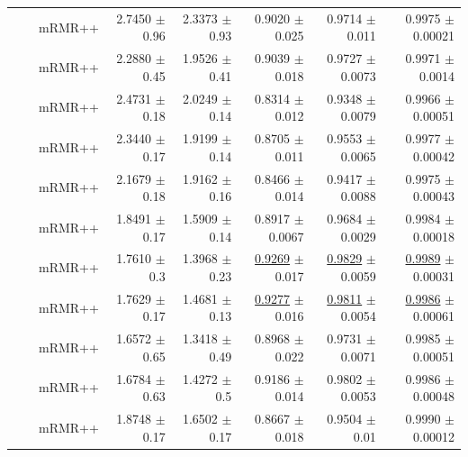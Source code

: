 \begin{longtable}{llp{}rrrrr}
 &  & mRMR++ & 2.7450 {\scriptsize $\pm$ 0.96} & 2.3373 {\scriptsize $\pm$ 0.93} & 0.9020 {\scriptsize $\pm$ 0.025} & 0.9714 {\scriptsize $\pm$ 0.011} & 0.9975 {\scriptsize $\pm$ 0.00021} \\
 &  & mRMR++ & 2.2880 {\scriptsize $\pm$ 0.45} & 1.9526 {\scriptsize $\pm$ 0.41} & 0.9039 {\scriptsize $\pm$ 0.018} & 0.9727 {\scriptsize $\pm$ 0.0073} & 0.9971 {\scriptsize $\pm$ 0.0014} \\
 &  & mRMR++ & 2.4731 {\scriptsize $\pm$ 0.18} & 2.0249 {\scriptsize $\pm$ 0.14} & 0.8314 {\scriptsize $\pm$ 0.012} & 0.9348 {\scriptsize $\pm$ 0.0079} & 0.9966 {\scriptsize $\pm$ 0.00051} \\
 &  & mRMR++ & 2.3440 {\scriptsize $\pm$ 0.17} & 1.9199 {\scriptsize $\pm$ 0.14} & 0.8705 {\scriptsize $\pm$ 0.011} & 0.9553 {\scriptsize $\pm$ 0.0065} & 0.9977 {\scriptsize $\pm$ 0.00042} \\
 &  & mRMR++ & 2.1679 {\scriptsize $\pm$ 0.18} & 1.9162 {\scriptsize $\pm$ 0.16} & 0.8466 {\scriptsize $\pm$ 0.014} & 0.9417 {\scriptsize $\pm$ 0.0088} & 0.9975 {\scriptsize $\pm$ 0.00043} \\
 &  & mRMR++ & 1.8491 {\scriptsize $\pm$ 0.17} & 1.5909 {\scriptsize $\pm$ 0.14} & 0.8917 {\scriptsize $\pm$ 0.0067} & 0.9684 {\scriptsize $\pm$ 0.0029} & 0.9984 {\scriptsize $\pm$ 0.00018} \\
 &  & mRMR++ & 1.7610 {\scriptsize $\pm$ 0.3} & 1.3968 {\scriptsize $\pm$ 0.23} & \underline{0.9269} {\scriptsize $\pm$ 0.017} & \underline{0.9829} {\scriptsize $\pm$ 0.0059} & \underline{0.9989} {\scriptsize $\pm$ 0.00031} \\
 &  & mRMR++ & 1.7629 {\scriptsize $\pm$ 0.17} & 1.4681 {\scriptsize $\pm$ 0.13} & \underline{0.9277} {\scriptsize $\pm$ 0.016} & \underline{0.9811} {\scriptsize $\pm$ 0.0054} & \underline{0.9986} {\scriptsize $\pm$ 0.00061} \\
 &  & mRMR++ & 1.6572 {\scriptsize $\pm$ 0.65} & 1.3418 {\scriptsize $\pm$ 0.49} & 0.8968 {\scriptsize $\pm$ 0.022} & 0.9731 {\scriptsize $\pm$ 0.0071} & 0.9985 {\scriptsize $\pm$ 0.00051} \\
 &  & mRMR++ & 1.6784 {\scriptsize $\pm$ 0.63} & 1.4272 {\scriptsize $\pm$ 0.5} & 0.9186 {\scriptsize $\pm$ 0.014} & 0.9802 {\scriptsize $\pm$ 0.0053} & 0.9986 {\scriptsize $\pm$ 0.00048} \\
 &  & mRMR++ & 1.8748 {\scriptsize $\pm$ 0.17} & 1.6502 {\scriptsize $\pm$ 0.17} & 0.8667 {\scriptsize $\pm$ 0.018} & 0.9504 {\scriptsize $\pm$ 0.01} & 0.9990 {\scriptsize $\pm$ 0.00012} \\

\end{longtable}
